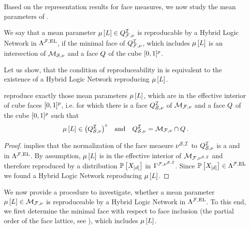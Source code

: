 \label{sec:HLNrepMean} %

Based on the representation results for face measures, we now study the mean parameters of \HybridLogicNetworks{}.

\begin{definition}
    \label{def:HLNrepMean}
    We say that a mean parameter $\mu\left[L\right]\in Q^{\mathcal{I}}_{\mathcal{F},\nu}$ is reproducable by a Hybrid Logic Network in $\Lambda^{\mathcal{F},\mathrm{EL}}$, if the minimal face of $Q^{\mathcal{I}}_{\mathcal{F},\nu}$, which includes $\mu\left[L\right]$ is an intersection of $\mathcal{M}_{\mathcal{S},\nu}$ and a face $Q$ of the cube $[0,1]^{p}$.
\end{definition}

Let us show, that the condition of reproduceability in  is equivalent to the existence of a Hybrid Logic Network reproducing $\mu\left[L\right]$.

\begin{theorem}
    \label{the:hlnInteriorCharacterization}
    \HybridLogicNetworks{} reproduce exactly those mean parameters $\mu\left[L\right]$, which are in the effective interior of cube faces $[0,1]^{p}$, i.e. for which there is a face $Q^{\mathcal{I}}_{\mathcal{S},\nu}$ of $\mathcal{M}_{\mathcal{F},\nu}$ and a face $Q$ of the cube $[0,1]^{p}$ such that
    \begin{align*}
        \mu\left[L\right]\in{\left(Q^{\mathcal{I}}_{\mathcal{S},\nu}\right)}^{\circ} \quad\text{and}\quad Q^{\mathcal{I}}_{\mathcal{S},\nu} = \mathcal{M}_{\mathcal{F},\nu}\cap Q \, .
    \end{align*}
\end{theorem}
\begin{proof}
     implies that the normalization of the face measure $\nu^{\mathcal{S},\mathcal{I}}$ to $Q^{\mathcal{I}}_{\mathcal{S},\nu}$ is a \HardLogicNetwork{} and in $\Lambda^{\mathcal{F},\mathrm{EL}}$.
    By assumption, $\mu\left[L\right]$ is in the effective interior of $\mathcal{M}_{\mathcal{F},\nu^{\mathcal{S},\mathcal{I}}}$ and therefore reproduced by a distribution $\mathbb{P}\left[X_{[d]}\right]$ in $\Gamma^{\mathcal{F},\nu^{\mathcal{S},\mathcal{I}}}$.
    Since $\mathbb{P}\left[X_{[d]}\right]\in\Lambda^{\mathcal{F},\mathrm{EL}}$ we found a Hybrid Logic Network reproducing $\mu\left[L\right]$.
\end{proof}

We now provide a procedure to investigate, whether a mean parameter $\mu\left[L\right]\in\mathcal{M}_{\mathcal{F},\nu}$ is reproduceable by a Hybrid Logic Network in $\Lambda^{\mathcal{F},\mathrm{EL}}$.
To this end, we first determine the minimal face with respect to face inclusion (the partial order of the face lattice, see \cite{ziegler_lectures_2013}), which includes $\mu\left[L\right]$.

